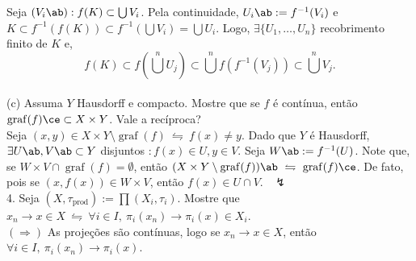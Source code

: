 \textcolor{gris}{Seja \((V_i\ab): f(K) \subset \bigcup V_i\). Pela continuidade, \(U_i\ab := f^{-1}(V_i)\) e \(K \subset f^{-1}(f(K)) \subset f^{-1}\left(\bigcup V_i\right) = \bigcup U_i \). Logo, \(\exists \{U_1, \ldots, U_n\}\) recobrimento finito de \(K\) e, 
\[f(K) \subset f\left(\bigcup^n U_j\right) \subset \bigcup^n f (f^{-1}(V_j)) \subset \bigcup^n V_j.\] }\\
(c) Assuma \(Y\) Hausdorff e compacto. Mostre que se \(f\) é contínua, então \(\operatorname{graf}(f)\ce \subset X\times Y\). Vale a recíproca? \\ 
\textcolor{gris}{
  Seja \((x,y) \in X \times Y \setminus \operatorname{graf}(f)\ \leftrightharpoons \ f(x) \neq y\). Dado que \(Y\) é Hausdorff, \(\exists U\ab, V\ab \subset Y\) disjuntos \(: f(x)\in U, y \in V\). Seja \(W\ab := f^{-1}(U)\). Note que, se \(W\times V \cap \operatorname{graf}(f) = \emptyset\), então \((X\times Y \setminus \operatorname{graf}(f))\ab \ \leftrightharpoons \ \operatorname{graf}(f)\ce\). De fato, pois se \((x,f(x)) \in W \times V\), então \(f(x) \in U \cap V\). \ \(\lightning\)
} \\ 
4. Seja \((X, \tau_\text{prod}):= \prod (X_i,\tau_i)\). Mostre que \(x_n\to x \in X \ \leftrightharpoons \ \forall i \in I, \ \pi_i(x_n) \to \pi_i(x) \in X_i\).\\ 
\textcolor{gris}{
  \((\Rightarrow)\) As projeções são contínuas, logo se \(x_n \to x \in X \), então \(\forall i \in I, \ \pi_i(x_n) \to \pi_i(x)\). 
} 
